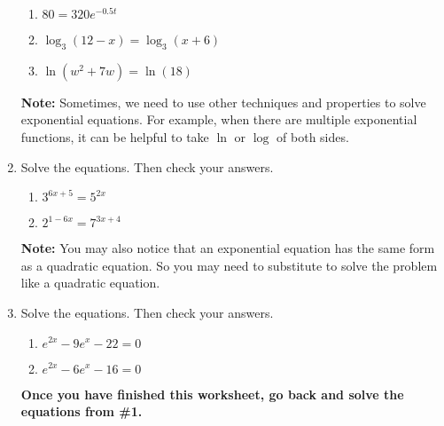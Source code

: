 \begin{enumerate}
\begin{enumerate}
\item $80=320e^{-0.5t}$
\vfill

\item $\log_3(12-x)=\log_3(x+6)$
\vfill

\item $\ln(w^2+7w)=\ln(18)$
\vfill

\end{enumerate}



\newpage


\noindent \textbf{Note:  }Sometimes, we need to use other techniques and properties to solve exponential equations.  For example, when there are multiple exponential functions, it can be helpful to take $\ln$ or $\log$ of both sides.  \\

\item Solve the equations.  Then check your answers.
\begin{enumerate}
\item $3^{6x+5}=5^{2x}$
\vfill

\item $2^{1-6x}=7^{3x+4}$
\vfill

\end{enumerate}
\newpage

\noindent \textbf{Note:  }  You may also notice that an exponential equation has the same form as a quadratic equation.  So you may need to substitute to solve the problem like a quadratic equation.


\item Solve the equations.  Then check your answers.
\begin{enumerate}
\item $e^{2x}-9e^x-22=0$\vfill
\item $e^{2x}-6e^x-16=0$\vfill

\end{enumerate}

\noindent \textbf{Once you have finished this worksheet, go back and solve the equations from \#1.}


\end{enumerate}

